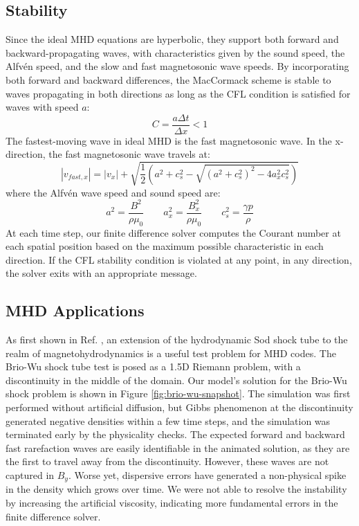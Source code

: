 \documentclass[%
 reprint,
 amsmath,amssymb,
 aps,
]{revtex4-2}
\begin{document}
\subsection{Stability}

Since the ideal MHD equations are hyperbolic, they support both forward and backward-propagating waves, with characteristics given by the sound speed, the Alfvén speed, and the slow and fast magnetosonic wave speeds. By incorporating both forward and backward differences, the MacCormack scheme is stable to waves propagating in both directions as long as the CFL condition is satisfied for waves with speed $a$:
\begin{equation}
C = \frac{a \Delta t}{\Delta x} < 1
\end{equation}
The fastest-moving wave in ideal MHD is the fast magnetosonic wave. In the x-direction, the fast magnetosonic wave travels at:
\begin{equation}
|v_{fast, x}| = |v_x| + \sqrt{\frac{1}{2}\left(a^2 + c_s ^2 - \sqrt{(a^2 + c_s ^2)^2 - 4 a_x ^2 c_s ^2} \right) }
\end{equation}
where the Alfvén wave speed and sound speed are:
\begin{equation}
a^2 = \frac{B^2}{\rho \mu_0} \qquad a_x ^2 = \frac{B_x ^2}{\rho \mu_0} \qquad c_s ^2 = \frac{\gamma p}{\rho}
\end{equation}
At each time step, our finite difference solver computes the Courant number at each spatial position based on the maximum possible characteristic in each direction. If the CFL stability condition is violated at any point, in any direction, the solver exits with an appropriate message.

\subsection{MHD Applications}

As first shown in Ref. \cite{BRIO1988400}, an extension of the hydrodynamic Sod shock tube to the realm of magnetohydrodynamics is a useful test problem for MHD codes. The Brio-Wu shock tube test is posed as a 1.5D Riemann problem, with a discontinuity in the middle of the domain. Our model's solution for the Brio-Wu shock problem is shown in Figure \ref{fig:brio-wu-snapshot}. The simulation was first performed without artificial diffusion, but Gibbs phenomenon at the discontinuity generated negative densities within a few time steps, and the simulation was terminated early by the physicality checks. The expected forward and backward fast rarefaction waves are easily identifiable in the animated solution, as they are the first to travel away from the discontinuity. However, these waves are not captured in $B_y$. Worse yet, dispersive errors have generated a non-physical spike in the density which grows over time. We were not able to resolve the instability by increasing the artificial viscosity, indicating more fundamental errors in the finite difference solver.
\end{document}
